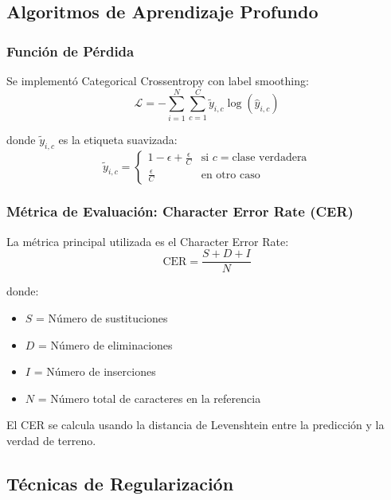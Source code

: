 \documentclass[12pt,a4paper]{article}
\begin{document}
\subsection{Algoritmos de Aprendizaje Profundo}

\subsubsection{Función de Pérdida}

Se implementó Categorical Crossentropy con label smoothing:
\begin{equation}
\mathcal{L} = -\sum_{i=1}^{N} \sum_{c=1}^{C} \tilde{y}_{i,c} \log(\hat{y}_{i,c})
\end{equation}

donde $\tilde{y}_{i,c}$ es la etiqueta suavizada:
\begin{equation}
\tilde{y}_{i,c} = \begin{cases}
1 - \epsilon + \frac{\epsilon}{C} & \text{si } c = \text{clase verdadera} \\
\frac{\epsilon}{C} & \text{en otro caso}
\end{cases}
\end{equation}

\subsubsection{Métrica de Evaluación: Character Error Rate (CER)}

La métrica principal utilizada es el Character Error Rate:
\begin{equation}
\text{CER} = \frac{S + D + I}{N}
\end{equation}

donde:
\begin{itemize}
    \item $S$ = Número de sustituciones
    \item $D$ = Número de eliminaciones
    \item $I$ = Número de inserciones
    \item $N$ = Número total de caracteres en la referencia
\end{itemize}

El CER se calcula usando la distancia de Levenshtein entre la predicción y la verdad de terreno.

\subsection{Técnicas de Regularización}
\end{document}
